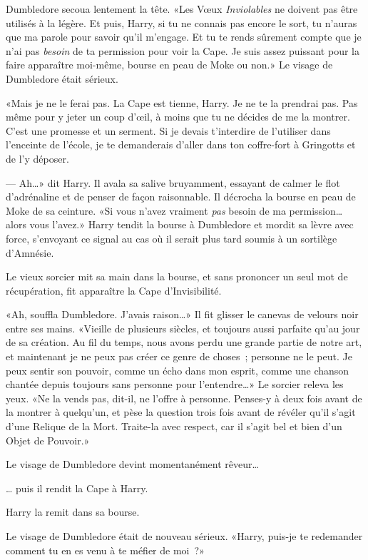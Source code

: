 Dumbledore secoua lentement la tête. «Les Vœux \emph{Inviolables} ne doivent pas être utilisés à la légère. Et puis, Harry, si tu ne connais pas encore le sort, tu n'auras que ma parole pour savoir qu'il m'engage. Et tu te rends sûrement compte que je n'ai pas \emph{besoin} de ta permission pour voir la Cape. Je suis assez puissant pour la faire apparaître moi-même, bourse en peau de Moke ou non.» Le visage de Dumbledore était sérieux.

«Mais je ne le ferai pas. La Cape est tienne, Harry. Je ne te la prendrai pas. Pas même pour y jeter un coup d'œil, à moins que tu ne décides de me la montrer. C'est une promesse et un serment. Si je devais t'interdire de l'utiliser dans l'enceinte de l'école, je te demanderais d'aller dans ton coffre-fort à Gringotts et de l'y déposer.

--- Ah…» dit Harry. Il avala sa salive bruyamment, essayant de calmer le flot d'adrénaline et de penser de façon raisonnable. Il décrocha la bourse en peau de Moke de sa ceinture. «Si vous n'avez vraiment \emph{pas} besoin de ma permission… alors vous l'avez.» Harry tendit la bourse à Dumbledore et mordit sa lèvre avec force, s'envoyant ce signal au cas où il serait plus tard soumis à un sortilège d'Amnésie.

Le vieux sorcier mit sa main dans la bourse, et sans prononcer un seul mot de récupération, fit apparaître la Cape d'Invisibilité.

«Ah, souffla Dumbledore. J'avais raison…» Il fit glisser le canevas de velours noir entre ses mains. «Vieille de plusieurs siècles, et toujours aussi parfaite qu'au jour de sa création. Au fil du temps, nous avons perdu une grande partie de notre art, et maintenant je ne peux pas créer ce genre de choses~; personne ne le peut. Je peux sentir son pouvoir, comme un écho dans mon esprit, comme une chanson chantée depuis toujours sans personne pour l'entendre…» Le sorcier releva les yeux. «Ne la vends pas, dit-il, ne l'offre à personne. Penses-y à deux fois avant de la montrer à quelqu'un, et pèse la question trois fois avant de révéler qu'il s'agit d'une Relique de la Mort. Traite-la avec respect, car il s'agit bel et bien d'un Objet de Pouvoir.»

Le visage de Dumbledore devint momentanément rêveur…

… puis il rendit la Cape à Harry.

Harry la remit dans sa bourse.

Le visage de Dumbledore était de nouveau sérieux. «Harry, puis-je te redemander comment tu en es venu à te méfier de moi~?»

